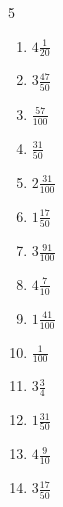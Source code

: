 \documentclass[12pt]{article}
\begin{document}
\begin{multicols}{5}
\begin{enumerate}
\item $ 4 \frac{1}{20} $
\item $ 3 \frac{47}{50} $
\item $ \frac{57}{100} $
\item $ \frac{31}{50} $
\item $ 2 \frac{31}{100} $
\item $ 1 \frac{17}{50} $
\item $ 3 \frac{91}{100} $
\item $ 4 \frac{7}{10} $
\item $ 1 \frac{41}{100} $
\item $ \frac{1}{100} $
\item $ 3 \frac{3}{4} $
\item $ 1 \frac{31}{50} $
\item $ 4 \frac{9}{10} $
\item $ 3 \frac{17}{50} $
\end{enumerate}\end{multicols}\newpage
\end{document}
